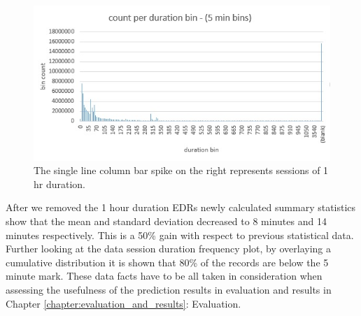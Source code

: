 \documentclass[12pt, a4paper]{report}
\theoremstyle{definition}
\theoremstyle{definition}%
\theoremstyle{definition}%
\theoremstyle{definition}%
\theoremstyle{definition}%
\theoremstyle{definition}%
\begin{document}
\begin{figure}	
	\includegraphics[scale=0.75]{data_session_duration_bin_count.jpg}
	\centering
	\caption[Data session duration distribution]{The single line column bar spike on the right represents sessions of 1 hr duration.}
	\label{fig:data_session_duration_bin_count}
\end{figure}

After we removed the 1 hour duration EDRs newly calculated summary statistics show that the mean and standard deviation decreased to 8 minutes and 14 minutes respectively. This is a 50\% gain with respect to previous statistical data. Further looking at the data session duration frequency plot, by overlaying a cumulative distribution it is shown that 80\% of the records are below the 5 minute mark. These data facts have to be all taken in consideration when assessing the usefulness of the prediction results in evaluation and results in Chapter \ref{chapter:evaluation_and_results}: Evaluation. 



\begin{table}[h]
	\label{table:summary statistics_02}
	\centering
	\caption{Basic summary statistics of main EDR dataset after removing 1 hour duration EDRs.} 
\end{table}
\end{document}
